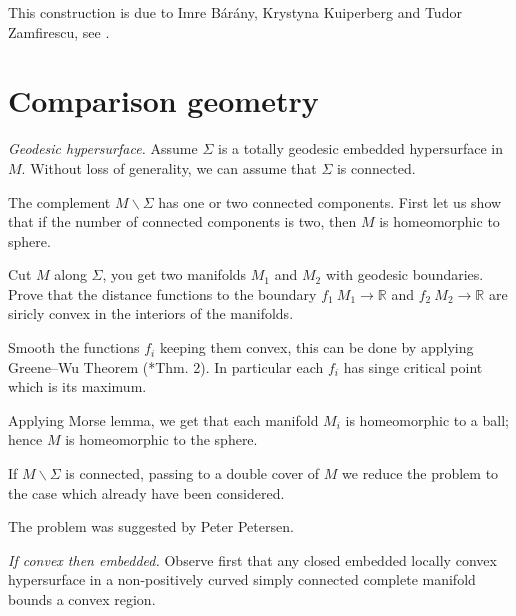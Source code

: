 This construction is due to 
Imre B{\'a}r{\'a}ny, 
Krystyna Kuiperberg 
and Tudor Zamfirescu,
see
\cite{imre-kuiperberg-zamfirescu}.


\section*{Comparison geometry}



\textit{Geodesic hypersurface.}
Assume $\Sigma$ is a totally geodesic embedded hypersurface in $M$.
Without loss of generality, we can assume that $\Sigma$ is connected.

The complement $M\backslash\Sigma$ has one or two connected components.
First let us show that if the number of connected components is two, then $M$ is homeomorphic to sphere.

Cut $M$ along $\Sigma$,
you get two manifolds $M_1$ and $M_2$
with geodesic boundaries. 
Prove that the distance functions to the boundary 
$f_1\:M_1\to\mathbb{R}$ and $f_2\:M_2\to\mathbb{R}$ are siricly convex in the interiors of the manifolds.

Smooth the functions $f_i$ keeping them convex, this can be done by applying Greene--Wu Theorem (\cite{greene-wu}*{Thm. 2}).
In particular each $f_i$ has singe critical point which is its maximum.

Applying Morse lemma, we get that each manifold $M_i$ is homeomorphic to a ball; 
hence $M$ 
is homeomorphic to the sphere.

If $M\backslash\Sigma$ is connected,
passing to a double cover of $M$ 
we reduce the problem to the case which already have been considered.

The problem was suggested by Peter Petersen.



\textit{If convex then embedded.}
Observe first that any closed embedded locally convex hypersurface in a non-positively curved simply connected complete manifold bounds a convex region.


